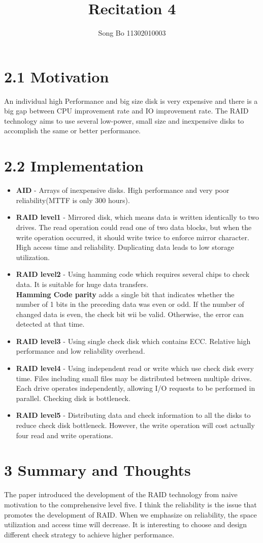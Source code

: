 \documentclass[12pt]{article}
\title{Recitation 4}
\author{Song Bo 11302010003}
\begin{document}
 
  \maketitle 
 \section*{2.1 Motivation}
 An individual high Performance and big size disk is very expensive and there is a big gap between CPU improvement rate and IO improvement rate. The RAID technology aims to use several low-power, small size and inexpensive disks to accomplish the same or better performance.
 \section*{2.2 Implementation}
 \begin{itemize}
 \item \textbf{AID} - Arrays of inexpensive disks. High performance and very poor reliability(MTTF is only 300 hours).
 \item \textbf{RAID level1} - Mirrored disk, which means data is written identically to two drives. The read operation could read one of two data blocks, but when the write operation occurred, it should write twice to enforce mirror character. High access time and reliability. Duplicating data leads to low storage utilization.
 \item \textbf{RAID level2} - Using hamming code which requires several chips to check data. It is suitable for huge data transfers.\\[1em]
 \textbf{Hamming Code parity} adds a single bit that indicates whether the number of 1 bits in the preceding data was even or odd. If the number of changed data is even, the check bit wii be valid. Otherwise, the error can detected at that time.
 \item \textbf{RAID level3} - Using single check disk which contains ECC. Relative high performance and low reliability overhead.
 \item \textbf{RAID level4} - Using independent read or write which use check disk every time. Files including small files may be distributed between multiple drives. Each drive operates independently, allowing I/O requests to be performed in parallel. Checking disk is bottleneck.
 \item \textbf{RAID level5} - Distributing data and check information to all the disks to reduce check disk bottleneck. However, the write operation will cost actually four read and write operations.
 \end{itemize}
 \section*{3 Summary and Thoughts}
 The paper introduced the development of the RAID technology from naive motivation to the comprehensive level five. I think the reliability is the issue that promotes the development of RAID. When we emphasize on reliability, the space utilization and access time will decrease. It is interesting to choose and design different check strategy to achieve higher performance.
\end{document}
